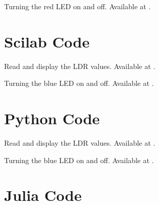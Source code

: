 \begin{ardcode}
{Turning the red LED on and off.  Available at
  .}
\label{ard:ldr-led}

\end{ardcode}


\section{Scilab Code}
\label{sec:ldr-scilab-code}

\begin{scicode}
{Read and display the LDR values.  Available at
  .}
\label{sci:ldr-read}

\end{scicode}

\begin{scicode}
{Turning the blue LED on and off.  Available at
  .}
\label{sci:ldr-led}

\end{scicode}

\section{Python Code}
\label{sec:ldr-python-code}

\begin{pycode}
{Read and display the LDR values.  Available at
  .}
\label{py:ldr-read}

\end{pycode}

\begin{pycode}
{Turning the blue LED on and off.  Available at
  .}
\label{py:ldr-led}

\end{pycode}



\section{Julia Code}
\label{sec:ldr-julia-code}


